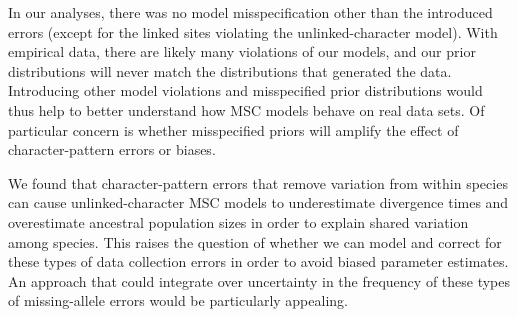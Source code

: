 In our analyses, there was no model misspecification other than the introduced
errors (except for the linked sites violating the unlinked-character model).
With empirical data, there are likely many violations of our models,
and our prior distributions will never match the distributions that generated
the data.
Introducing other model violations and misspecified prior distributions
would thus help to better understand how MSC models behave on real
data sets.
Of particular concern is whether misspecified priors will amplify the effect of
character-pattern errors or biases.

We found that character-pattern errors that remove variation from within
species can cause unlinked-character MSC models to underestimate divergence
times and overestimate ancestral population sizes in order to explain shared
variation among species.
This raises the question of whether we can model and correct for these types of
data collection errors in order to avoid biased parameter estimates.
An approach that could integrate over uncertainty in the frequency of these
types of missing-allele errors would be particularly appealing.


